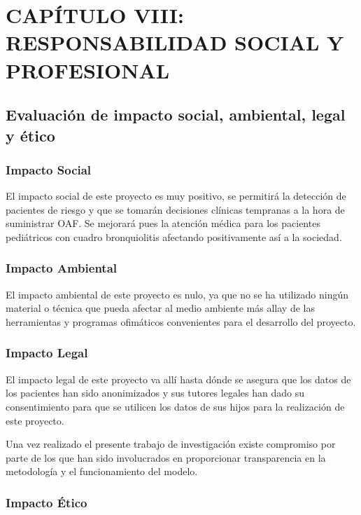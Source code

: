 \section{CAPÍTULO VIII: RESPONSABILIDAD SOCIAL Y PROFESIONAL}\label{cap:responsabilidadSocialYProfesional}

\subsection{Evaluación de impacto social, ambiental, legal y ético}

\subsubsection{Impacto Social}

El impacto social de este proyecto es muy positivo, se permitirá la detección de pacientes de riesgo y que se tomarán decisiones clínicas tempranas a la hora de suministrar OAF. Se mejorará pues la atención médica para los pacientes pediátricos con cuadro bronquiolitis afectando positivamente así a la sociedad. 

\subsubsection{Impacto Ambiental}

El impacto ambiental de este proyecto es nulo, ya que no se ha utilizado ningún material o técnica que pueda afectar al medio ambiente más allay de las herramientas y programas ofimáticos convenientes para el desarrollo del proyecto.

\subsubsection{Impacto Legal}

El impacto legal de este proyecto va allí hasta dónde se asegura que los datos de los pacientes han sido anonimizados y sus tutores legales han dado su consentimiento para que se utilicen los datos de sus hijos para la realización de este proyecto.

Una vez realizado el presente trabajo de investigación existe compromiso por parte de los que han sido involucrados en proporcionar transparencia en la metodología y el funcionamiento del modelo. 

\subsubsection{Impacto Ético}

